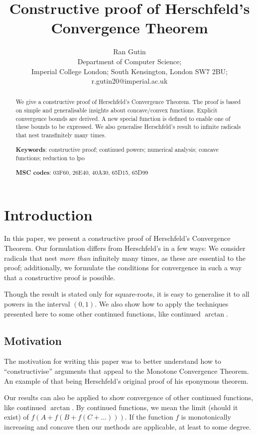 \documentclass[
]{article}
\title{Constructive proof of Herschfeld's Convergence Theorem}
\author{Ran Gutin \\ Department of Computer Science; \\Imperial College London; South Kensington, London SW7 2BU; \\ r.gutin20@imperial.ac.uk}
\date{}
\theoremstyle{theorem}
\theoremstyle{lemma}
\theoremstyle{corollary}
\theoremstyle{remark}
\theoremstyle{definition}
\begin{document}
\maketitle
\begin{abstract}
We give a constructive proof of Herschfeld's Convergence Theorem. The proof is based on simple and generalisable insights about concave/convex functions. Explicit convergence bounds are derived. A new special function is defined to enable one of these bounds to be expressed. We also generalise Herschfeld's result to infinite radicals that nest transfinitely many times.

\textbf{Keywords}: constructive proof; continued powers; numerical analysis; concave functions; reduction to lpo

\textbf{MSC codes}: 03F60, 26E40, 40A30, 65D15, 65D99
\end{abstract}

\hypertarget{introduction}{%
\section{Introduction}\label{introduction}}

In this paper, we present a constructive proof of Herschfeld's Convergence Theorem. Our formulation differs from Herschfeld's in a few ways: We consider radicals that nest \emph{more than} infinitely many times, as these are essential to the proof; additionally, we formulate the conditions for convergence in such a way that a constructive proof is possible.

Though the result is stated only for square-roots, it is easy to generalise it to all powers in the interval \((0,1)\). We also show how to apply the techniques presented here to some other continued functions, like continued \(\arctan\).

\hypertarget{motivation}{%
\subsection{Motivation}\label{motivation}}

The motivation for writing this paper was to better understand how to ``constructivise'' arguments that appeal to the Monotone Convergence Theorem. An example of that being Herschfeld's original proof of his eponymous theorem.

Our results can also be applied to show convergence of other continued functions, like continued \(\arctan\). By continued functions, we mean the limit (should it exist) of \(f(A + f(B + f(C + \dotsc)))\). If the function \(f\) is monotonically increasing and concave then our methods are applicable, at least to some degree.
\end{document}

